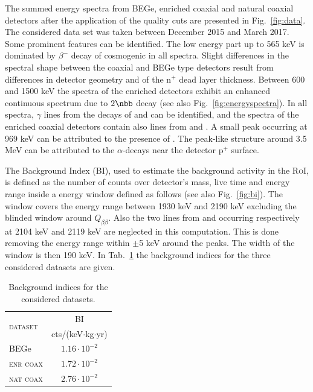  The summed energy spectra from BEGe, enriched coaxial and natural coaxial detectors after the application of the quality cuts are presented in Fig.~\ref{fig:data}. The considered data set was taken between December 2015 and March 2017. Some prominent features can be identified. The low energy part up to 565 keV is dominated by $\beta^-$ decay of cosmogenic  in all spectra. Slight differences in the spectral shape between the coaxial and BEGe type detectors result from differences in detector geometry and of the n$^+$ dead layer thickness. Between 600 and 1500 keV the spectra of the enriched detectors exhibit an enhanced continuous spectrum due to $2\nbb$ decay (see also Fig.~\ref{fig:energyspectra}). In all spectra, $\gamma$ lines from the decays of  and  can be identified, and the spectra of the enriched coaxial detectors contain also lines from  and . A small peak occurring at 969 keV can be attributed to the presence of . The peak-like structure around 3.5 MeV can be attributed to the $\alpha$-decays near the detector p$^+$ surface.

 The Background Index (BI), used to estimate the background activity in the \textsc{RoI}, is defined as the number of counts over detector's mass, live time and energy range inside a energy window defined as follows (see also Fig.~\ref{fig:bi}). The window covers the energy range between 1930 keV and 2190 keV excluding the blinded window around $Q_{\beta\beta}$. Also the two lines from  and  occurring respectively at 2104 keV and 2119 keV are neglected in this computation. This is done removing the energy range within $\pm$5 keV around the peaks. The width of the window is then 190 keV. In Tab.~\ref{tab:bindex} the background indices for the three considered datasets are given.
\begin{table}[b]
	\centering
	\caption{Background indices for the considered datasets.}
	\label{tab:bindex}
	\begin{tabular}{lc}
		\toprule
		\multirow{2}{*}{\textsc{dataset}}	&	BI \\
											&	cts/(keV$\cdot$kg$\cdot$yr) \\
		\midrule
		BEGe								&	$1.16\cdot10^{-2}$	\\
		\textsc{enr coax}					&	$1.72\cdot10^{-2}$	\\
		\textsc{nat coax}					&	$2.76\cdot10^{-2}$	\\
		\bottomrule
	\end{tabular}
\end{table}

